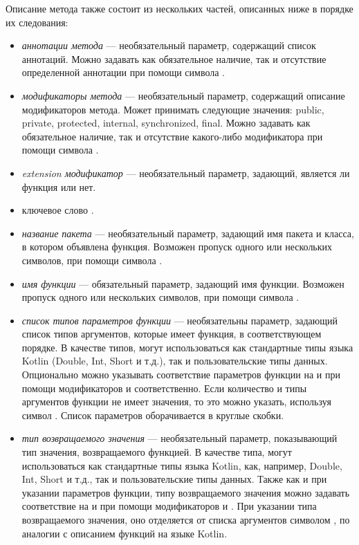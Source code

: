 Описание метода также состоит из нескольких частей, описанных ниже в порядке их
следования:
\begin{itemize}
	\item \textit{аннотации метода} --- необязательный параметр, содержащий
		  список аннотаций.
		  Можно задавать как обязательное наличие, так и отсутствие определенной
		  аннотации при помощи символа \quotes{!}.
	\item \textit{модификаторы метода} --- необязательный параметр, содержащий
		  описание модификаторов метода.
		  Может принимать следующие значения: public, private, protected,
		  internal, synchronized, final.
		  Можно задавать как обязательное наличие, так и отсутствие какого-либо
		  модификатора при помощи символа \quotes{!}.
	\item \textit{extension модификатор} --- необязательный параметр, задающий,
		  является ли функция  или нет.
	\item ключевое слово .
	\item \textit{название пакета} --- необязательный параметр, задающий имя
		  пакета и класса, в котором объявлена функция.
		  Возможен пропуск одного или нескольких символов, при помощи символа
		  \quotes{*}.
	\item \textit{имя функции} --- обязательный параметр, задающий имя функции.
		  Возможен пропуск одного или нескольких символов, при помощи символа
		  \quotes{*}.
	\item \textit{список типов параметров функции} --- необязательны параметр,
		  задающий список типов аргументов, которые имеет функция, в
		  соответствующем порядке.
		  В качестве типов, могут использоваться как стандартные типы языка
		  Kotlin (Double, Int, Short и т.д.), так и
		  пользовательские типы данных.
		  Опционально можно указывать соответствие параметров функции на
		   и  при помощи модификаторов
		  \quotes{!!} и  соответственно.
		  Если количество и типы аргументов функции не имеет значения, то это
		  можно указать, используя символ .
		  Список параметров оборачивается в круглые скобки.
	\item \textit{тип возвращаемого значения} --- необязательный параметр,
		  показывающий тип значения, возвращаемого функцией.
		  В качестве типа, могут использоваться как стандартные типы языка
		  Kotlin, как, например, Double, Int, Short и т.д., так и
		  пользовательские типы данных.
		  Также как и при указании параметров функции, типу возвращаемого
		  значения можно задавать соответствие на  и
		   при помощи модификаторов \quotes{!!} и .
		  При указании типа возвращаемого значения, оно отделяется от списка
		  аргументов символом \quotes{:}, по аналогии с описанием функций на
		  языке Kotlin.
\end{itemize}

